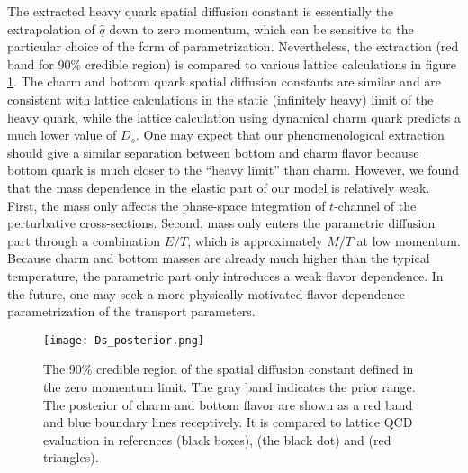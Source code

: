 The extracted heavy quark spatial diffusion constant is essentially the extrapolation of $\hat{q}$ down to zero momentum, which can be sensitive to the particular choice of the form of parametrization.
Nevertheless, the extraction (red band for 90\% credible region) is compared to various lattice calculations \cite{Banerjee:2011ra,Ding:2012sp,Francis:2015daa} in  figure \ref{fig:new:posterior-Ds}.
The charm and bottom quark spatial diffusion constants are similar and are consistent with lattice calculations in the static (infinitely heavy) limit of the heavy quark, while the lattice calculation using dynamical charm quark predicts a much lower value of $D_s$.
One may expect that our phenomenological extraction should give a similar separation between bottom and charm flavor because bottom quark is much closer to the ``heavy limit'' than charm.
However, we found that the mass dependence in the elastic part of our model is relatively weak. 
First, the mass only affects the phase-space integration of $t$-channel of the perturbative cross-sections.
Second, mass only enters the parametric diffusion part through a combination $E/T$, which is approximately $M/T$ at low momentum. Because charm and bottom masses are already much higher than the typical temperature, the parametric part only introduces a weak flavor dependence.
In the future, one may seek a more physically motivated flavor dependence parametrization of the transport parameters.

\begin{figure}
\singlespacing
\centering
\texttt{[image: Ds\_posterior.png]}
\caption[The 90\% credible region of the spatial diffusion constant defined]{The 90\% credible region of the spatial diffusion constant defined in the zero momentum limit. The gray band indicates the prior range. The posterior of charm and bottom flavor are shown as a red band and blue boundary lines receptively. It is compared to lattice QCD evaluation in references \cite{Banerjee:2011ra} (black boxes), \cite{Francis:2015daa} (the black dot) and \cite{Ding:2012sp} (red triangles).}
\label{fig:new:posterior-Ds}
\end{figure}
